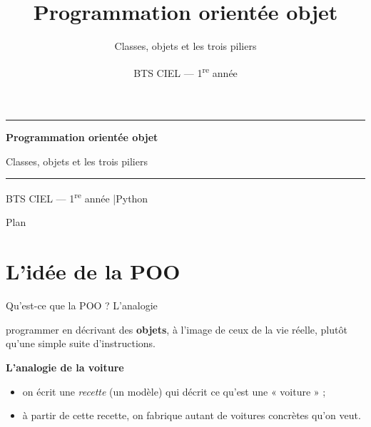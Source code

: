 \documentclass[11pt,aspectratio=169]{beamer}
\title{Programmation orientée objet}
\subtitle{Classes, objets et les trois piliers}
\author{}
\date{BTS CIEL --- 1\textsuperscript{re} année}
\newcommand{\py}[1]{\texttt{#1}}
\begin{document}
{
\begin{frame}[plain]
  \vfill
  \begin{center}
    {\color{cdcbar}\rule{0.5\linewidth}{1.2pt}}\par\medskip
    {\LARGE\bfseries\color{qbar}Programmation orientée objet\par}\medskip
    {\large Classes, objets et les trois piliers\par}\medskip
    {\color{cdcbar}\rule{0.5\linewidth}{1.2pt}}\par\bigskip
    {\color{grisfoot}BTS CIEL --- 1\textsuperscript{re} année \quad|\quad Python}
  \end{center}
  \vfill
\end{frame}}

\begin{frame}{Plan}
  \tableofcontents
\end{frame}

\section{L'idée de la POO}

\begin{frame}{Qu'est-ce que la POO ? L'analogie}
  \begin{defi}
    programmer en décrivant des \textbf{objets}, à l'image de ceux de la vie réelle,
    plutôt qu'une simple suite d'instructions.
  \end{defi}
  \medskip
  \textbf{L'analogie de la voiture}
  \begin{itemize}
    \item on écrit une \emph{recette} (un modèle) qui décrit ce qu'est une « voiture » ;
    \item à partir de cette recette, on fabrique autant de voitures concrètes qu'on veut.
  \end{itemize}
  \medskip
  \begin{center}
  \end{center}
\end{frame}
\end{document}
